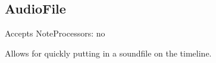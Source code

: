 \subsection{AudioFile}\label{audioFile}

Accepts NoteProcessors: no

Allows for quickly putting in a soundfile on the timeline.
